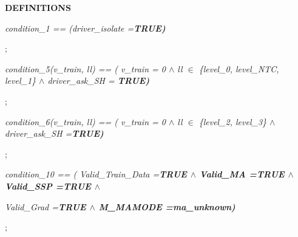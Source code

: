 \documentclass[11pt]{article}
\begin{document}
\begin{sloppypar}
\bf DEFINITIONS

\hspace*{0.20in}\hspace*{0.20in}\it condition\_1 \rm == \rm (\it driver\_isolate \rm =\hspace*{0.10in}\bf TRUE\rm )

\hspace*{0.20in}\rm ;

\hspace*{0.20in}\hspace*{0.20in}

\hspace*{0.20in}\it condition\_5\rm (\it v\_train\rm , \it ll\rm ) \rm == \rm ( \it v\_train \rm = \rm 0  $\land$  \it ll  $\in$  \rm \{\it level\_0\rm , \it level\_NTC\rm , \it level\_1\rm \}  $\land$  \it driver\_ask\_SH \rm = \bf TRUE\rm )

\hspace*{0.20in}\rm ;

\hspace*{0.20in}\hspace*{0.20in}

\hspace*{0.20in}\it condition\_6\rm (\it v\_train\rm , \it ll\rm ) \rm == \rm ( \it v\_train \rm = \rm 0\hspace*{0.10in} $\land$  \it ll  $\in$  \rm \{\it level\_2\rm , \it level\_3\rm \}  $\land$  \it driver\_ask\_SH \rm =\hspace*{0.10in}\bf TRUE\rm ) 

\hspace*{0.20in}\rm ;

\hspace*{0.20in}\hspace*{0.20in}

\hspace*{0.20in}\it condition\_10 \rm == \rm ( \it Valid\_Train\_Data \rm =\hspace*{0.10in}\bf TRUE  $\land$  \it Valid\_MA \rm =\hspace*{0.10in}\bf TRUE  $\land$  \it Valid\_SSP \rm =\hspace*{0.10in}\bf TRUE  $\land$  

\hspace*{1.40in}\it Valid\_Grad \rm =\hspace*{0.10in}\bf TRUE  $\land$  \it M\_MAMODE \rm =\hspace*{0.10in}\it ma\_unknown\rm )

\hspace*{0.20in}\rm ;


\end{sloppypar}
\end{document}
